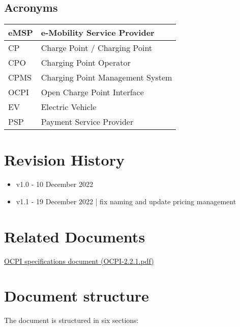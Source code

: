 \subsection{Acronyms}
\begin{tabular}{|l|l|}
	\hline
	eMSP & e-Mobility Service Provider\\
	\hline
	CP & Charge Point / Charging Point\\
	\hline
	CPO & Charging Point Operator\\
	\hline
	CPMS & Charging Point Management System\\
	\hline
	OCPI & Open Charge Point Interface\\
	\hline
	EV & Electric Vehicle\\
	\hline
	PSP & Payment Service Provider\\
	\hline
\end{tabular}

\section{Revision History}
\begin{itemize}
	\item v1.0 - 10 December 2022
	\item v1.1 - 19 December 2022 | fix naming and update pricing management
\end{itemize}

\section{Related Documents}
\href{../Specs/OCPI-2.2.1.pdf}{OCPI specifications document (OCPI-2.2.1.pdf)}

\section{Document structure}
The document is structured in six sections:

